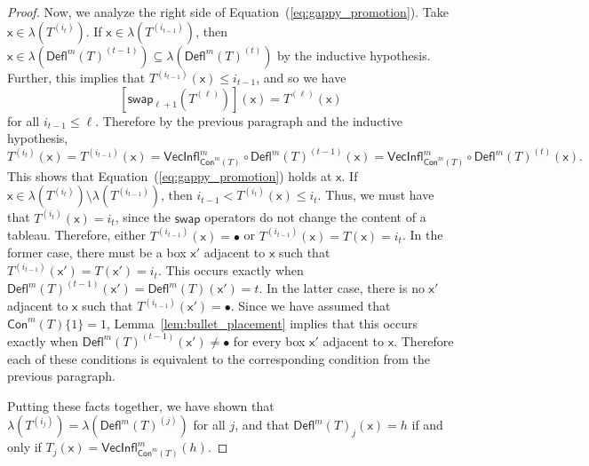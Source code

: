 \documentclass[12pt]{amsart}
\newcommand{\x}{\ensuremath{\mathsf{x}}}
\theoremstyle{definition}
\theoremstyle{remark}
\newtheorem{remark}[theorem]{Remark}
\numberwithin{equation}{section}
\newcommand{\inc}{\ensuremath{\mathrm{Inc}}}
\newcommand{\swap}{\ensuremath{\mathsf{swap}}}
\newcommand{\deflate}{\ensuremath{\mathsf{Defl}}}
\newcommand{\inflate}{\ensuremath{\mathsf{VecInfl}}}
\newcommand{\content}{\ensuremath{\mathsf{Con}}}
\begin{document}
\begin{proof}
Now, we analyze the right side of Equation~(\ref{eq:gappy_promotion}). Take $\x \in \lambda\left( T^{(i_t)} \right)$.   If $\x \in \lambda \left(T^{(i_{t-1})} \right)$, then $\x \in \lambda(\deflate^m(T)^{(t-1)}) \subseteq \lambda(\deflate^m(T)^{(t)})$ by the inductive hypothesis. Further, this implies that $T^{(i_{t-1})}(\x) \leq i_{t-1}$,  and so we have
\[
\left[ \swap_{\ell+1} \left(T^{(\ell)} \right) \right](\x) = T^{(\ell)}(\x)
\]
 for all $i_{t-1} \leq \ell$. Therefore by the previous paragraph and the inductive hypothesis,
 \[ T^{(i_t)}(\x) = T^{(i_{t-1})}(\x) = \inflate^m_{\content^m(T)} \circ \deflate^m(T)^{(t-1)}(\x) =  \inflate^m_{\content^m(T)} \circ \deflate^m(T)^{(t)}(\x). \] This shows that Equation~(\ref{eq:gappy_promotion}) holds at $\x$. If $\x \in \lambda \left(T^{(i_{t})} \right) \setminus \lambda \left(T^{(i_{t-1})} \right)$, then $i_{t-1} < T^{(i_{t})}(\x) \leq i_t$. Thus, we must have that $T^{(i_{t})}(\x) = i_{t}$, since the $\swap$ operators do not change the content of a tableau. Therefore, either $T^{(i_{t-1})}(\x) = \bullet$ or $T^{(i_{t-1})}(\x) =  T(\x) = i_{t}$. In the former case, there must be a box $\x'$ adjacent to $\x$ such that $T^{(i_{t-1})}(\x') = T(\x') = i_{t}$. This occurs exactly when $\deflate^m(T)^{(t-1)}(\x') = \deflate^m(T)(\x') = t$. In the latter case, there is no $\x'$ adjacent to $\x$ such that $T^{(i_{t-1})}(\x') = \bullet$. Since we have assumed that  $\content^m(T) \lbrace 1 \rbrace = 1$, Lemma~\ref{lem:bullet_placement} implies that this occurs exactly when  $\deflate^m(T)^{(t-1)}(\x') \neq \bullet$ for every box $\x'$ adjacent to $\x$. Therefore each of these conditions is equivalent to the corresponding condition from the previous paragraph. 
 
Putting these facts together, we have shown that $\lambda \left(T^{(i_j)} \right) = \lambda \left(\deflate^m(T)^{(j)} \right)$ for all $j$, and that $\deflate^m(T)_j(\x) = h$ if and only if $T_j(\x) = \inflate^m_{\content^m(T)}(h)$. 
\end{proof}

%
\end{document}
